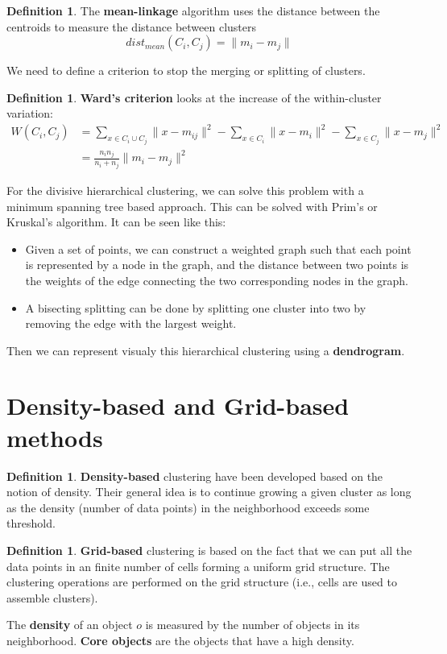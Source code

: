 \documentclass[12pt, openany]{report}
\theoremstyle{definition}
\newtheorem{definition}[thm]{Definition}
\begin{document}
\begin{definition}
    The \textbf{mean-linkage} algorithm uses the distance between the centroids to measure the distance between clusters
    \begin{equation}
        dist_{mean}(C_i, C_j) = \|m_i - m_j\|
    \end{equation}
\end{definition}
We need to define a criterion to stop the merging or splitting of clusters. 
\begin{definition}
    \textbf{Ward's criterion} looks at the increase of the within-cluster variation:
    \begin{equation}
        \begin{aligned}
            W(C_i, C_j) &= \sum_{x \in C_i \cup C_j} \|x - m_{ij}\|^2 - \sum_{x \in C_i} \|x - m_i\|^2 - \sum_{x \in C_j} \|x - m_j\|^2\\
            &= \frac{n_i n_j}{n_i + n_j} \|m_i - m_j\|^2
        \end{aligned}
    \end{equation}
\end{definition}
For the divisive hierarchical clustering, we can solve this problem with a minimum spanning tree based approach. This can be solved with Prim's or Kruskal's algorithm. It can be seen like this:
\begin{itemize}
    \item Given a set of points, we can construct a weighted graph such that each point is represented by a node in the graph, and the distance between two points is the weights of the edge connecting the two corresponding nodes in the graph.
    \item A bisecting splitting can be done by splitting one cluster into two by removing the edge with the largest weight.
\end{itemize}
Then we can represent visualy this hierarchical clustering using a \textbf{dendrogram}.
\section{Density-based and Grid-based methods}
\begin{definition}
    \textbf{Density-based} clustering have been developed based on the notion of density. Their general idea is to continue growing a given cluster as long as the density (number of data points) in the neighborhood exceeds some threshold.
\end{definition}
\begin{definition}
    \textbf{Grid-based} clustering is based on the fact that we can put all the data points in an finite number of cells forming a uniform grid structure. The clustering operations are performed on the grid structure (i.e., cells are used to assemble clusters).
\end{definition}
The \textbf{density} of an object $o$ is measured by the number of objects in its neighborhood. \textbf{Core objects} are the objects that have a high density.\\ 
\end{document}
